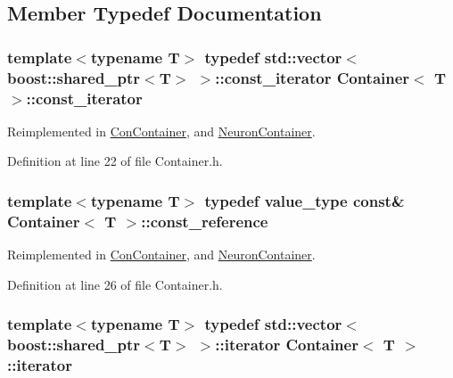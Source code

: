 \subsection{Member Typedef Documentation}
\hypertarget{class_container_a5eabadaffdd508cb623c955eb0af1518}{
\subsubsection[{const\_\-iterator}]{\setlength{\rightskip}{0pt plus 5cm}template$<$typename T$>$ typedef std::vector$<$boost::shared\_\-ptr$<$T$>$ $>$::{\bf const\_\-iterator} {\bf Container}$<$ T $>$::{\bf const\_\-iterator}}}
\label{class_container_a5eabadaffdd508cb623c955eb0af1518}


Reimplemented in \hyperlink{class_con_container_ac314ee4e351b3a5f595cd1de74fb3b5e}{ConContainer}, and \hyperlink{class_neuron_container_a41749602f05e7610da7f0f1fd59f5442}{NeuronContainer}.



Definition at line 22 of file Container.h.

\hypertarget{class_container_a8dd7ae9d0687e11d873f98206e961ac1}{
\subsubsection[{const\_\-reference}]{\setlength{\rightskip}{0pt plus 5cm}template$<$typename T$>$ typedef {\bf value\_\-type} const\& {\bf Container}$<$ T $>$::{\bf const\_\-reference}}}
\label{class_container_a8dd7ae9d0687e11d873f98206e961ac1}


Reimplemented in \hyperlink{class_con_container_ac644eca2f5ee432a6070fd1d397b3741}{ConContainer}, and \hyperlink{class_neuron_container_a468ffbb00b15553f73da46dd62c91c8d}{NeuronContainer}.



Definition at line 26 of file Container.h.

\hypertarget{class_container_afe880028d8304353129f47cd1d28c20a}{
\subsubsection[{iterator}]{\setlength{\rightskip}{0pt plus 5cm}template$<$typename T$>$ typedef std::vector$<$boost::shared\_\-ptr$<$T$>$ $>$::{\bf iterator} {\bf Container}$<$ T $>$::{\bf iterator}}}
\label{class_container_afe880028d8304353129f47cd1d28c20a}


